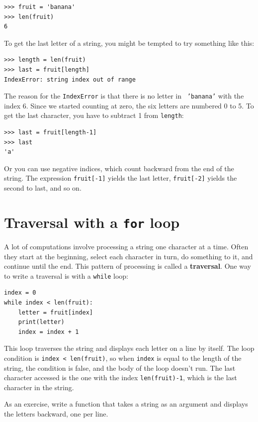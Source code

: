 \documentclass[10pt]{book}
\begin{document}
\begin{verbatim}
>>> fruit = 'banana'
>>> len(fruit)
6
\end{verbatim}
%
To get the last letter of a string, you might be tempted to try something
like this:

\begin{verbatim}
>>> length = len(fruit)
>>> last = fruit[length]
IndexError: string index out of range
\end{verbatim}
%
The reason for the {\tt IndexError} is that there is no letter in {\tt
'banana'} with the index 6.  Since we started counting at zero, the
six letters are numbered 0 to 5.  To get the last character, you have
to subtract 1 from {\tt length}:

\begin{verbatim}
>>> last = fruit[length-1]
>>> last
'a'
\end{verbatim}
%
Or you can use negative indices, which count backward from
the end of the string.  The expression {\tt fruit[-1]} yields the last
letter, {\tt fruit[-2]} yields the second to last, and so on.


\section{Traversal with a {\tt for} loop}
\label{for}

A lot of computations involve processing a string one character at a
time.  Often they start at the beginning, select each character in
turn, do something to it, and continue until the end.  This pattern of
processing is called a {\bf traversal}.  One way to write a traversal
is with a {\tt while} loop:

\begin{verbatim}
index = 0
while index < len(fruit):
    letter = fruit[index]
    print(letter)
    index = index + 1
\end{verbatim}
%
This loop traverses the string and displays each letter on a line by
itself.  The loop condition is {\tt index < len(fruit)}, so
when {\tt index} is equal to the length of the string, the
condition is false, and the body of the loop doesn't run.  The
last character accessed is the one with the index {\tt len(fruit)-1},
which is the last character in the string.

As an exercise, write a function that takes a string as an argument
and displays the letters backward, one per line.
\end{document}
